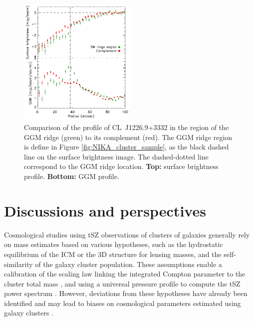 \documentclass[twocolumn,traditabstract]{aa}
\begin{document}
\begin{figure}[h]
\center
\includegraphics[trim=0cm 0cm 0cm 0cm, clip=true, width=0.5\textwidth]{Figure/profile_CLJ1227.pdf} 
\caption{\footnotesize{Comparison of the profile of \mbox{CL~J1226.9+3332} in the region of the GGM ridge (green) to its complement (red). The GGM ridge region is define in Figure \ref{fig:NIKA_cluster_sample}, as the black dashed line on the surface brightness image. The dashed-dotted line correspond to the GGM ridge location. {\bf Top:} surface brightness profile. {\bf Bottom:} GGM profile.}}
\label{fig:profile_CLJ1227}
\end{figure}

\section{Discussions and perspectives}\label{sec:discussions}
Cosmological studies using tSZ observations of clusters of galaxies generally rely on mass estimates based on various hypotheses, such as the hydrostatic equilibrium of the ICM or the 3D structure for lensing masses, and the self-similarity of the galaxy cluster population. These assumptions enable a calibration of the scaling law linking the integrated Compton parameter to the cluster total mass \citep[see, e.g,][]{Arnaud2007,Arnaud2010,Planck2013V}, and using a universal pressure profile to compute the tSZ power spectrum \citep[e.g.][]{Komatsu2002}. However, deviations from these hypotheses have already been identified and may lead to biases on cosmological parameters estimated using galaxy clusters \citep[see, e.g.][]{Ichikawa2013,McDonald2014,Planck2014XX,Planck2015XXIV,Planck2016XXII}.
\end{document}
